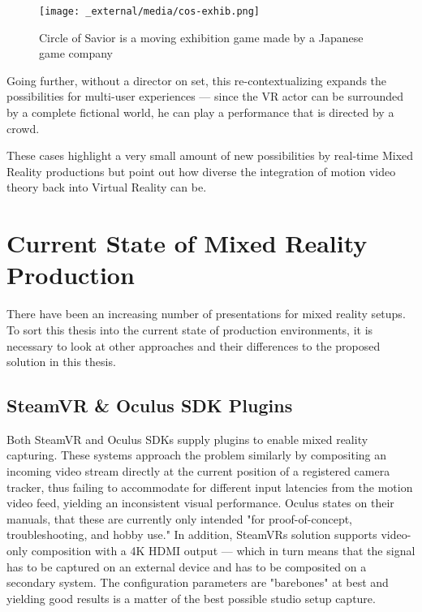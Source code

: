 \begin{figure}[htb]
	\texttt{[image: \_external/media/cos-exhib.png]}
	\caption{Circle of Savior is a moving exhibition game made by a Japanese 
	game company\cite{fivefor:cos:2017}}
	\label{fig:mr-cases:savior}
\end{figure}

Going further, without a director on set, this re-contextualizing expands the 
possibilities for multi-user experiences --- since the VR actor can be 
surrounded by a complete fictional world, he can play a performance that is 
directed by a crowd.

These cases highlight a very small amount of new possibilities by real-time 
Mixed Reality productions but point out how diverse the integration of motion 
video theory back into Virtual Reality can be.

\section{Current State of Mixed Reality Production}

There have been an increasing number of presentations for mixed reality setups. 
To sort this thesis into the current state of production environments, it is 
necessary to look at other approaches and their differences to the proposed 
solution in this thesis.

\subsection{SteamVR \& Oculus SDK Plugins}

Both SteamVR and Oculus SDKs supply plugins to enable mixed reality capturing. 
These systems approach the problem similarly by compositing an incoming video 
stream directly at the current position of a registered camera tracker, thus 
failing to accommodate for different input latencies from the motion video 
feed, yielding an inconsistent visual performance. Oculus states on their 
manuals, that these are currently only intended "for proof-of-concept, 
troubleshooting, and hobby use." \cite{oculus:mr-setup:2017}
\newline
In addition, SteamVRs solution supports video-only composition with a 4K 
HDMI output --- which in turn means that the signal has to be captured on an 
external device and has to be composited on a secondary system. The 
configuration parameters are "barebones" at best and yielding good results is a 
matter of the best possible studio setup capture.

